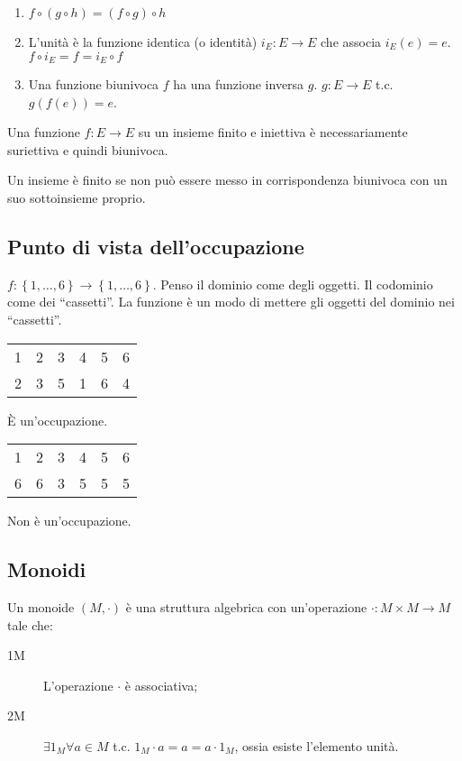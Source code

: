 \begin{enumerate}
    \item $f \circ \left( g \circ h \right) = \left( f \circ g \right) \circ h$ 
    \item L'unit\`a \`e la funzione identica (o identit\`a) $i_E : E \to E$ che associa $i_E(e) = e$. $f \circ i_E = f = i_E \circ f$ 
    \item Una funzione biunivoca $f$ ha una funzione inversa $g$. $g : E \to E $ t.c. $ g(f(e)) = e$.
\end{enumerate}

Una funzione $f : E \to E $ su un insieme finito e iniettiva \`e necessariamente suriettiva e quindi biunivoca.

Un insieme \`e finito se non pu\`o essere messo in corrispondenza biunivoca con un suo sottoinsieme proprio.

\subsection{Punto di vista dell'occupazione}

$f : \left \{ 1, \dots, 6 \right \} \to \left \{ 1, \dots, 6 \right \}$. Penso il dominio come degli oggetti. Il codominio come dei ``cassetti''. La funzione \`e un modo di mettere gli oggetti del dominio nei ``cassetti''.

\begin{tabular}{cccccc}
1 & 2 & 3 & 4 & 5 & 6 \\
2 & 3 & 5  &1 & 6 & 4
\end{tabular}
\`E un'occupazione.

\begin{tabular}{cccccc}
1 & 2 & 3 & 4 & 5 & 6 \\
6 & 6 & 3 & 5 & 5 & 5
\end{tabular}
Non \`e un'occupazione.

\subsection{Monoidi}

Un monoide $(M, \cdot)$ \`e una struttura algebrica con un'operazione $\cdot : M \times M \to M$ tale che:
\begin{description}
    \item[1M] L'operazione $\cdot$ \`e associativa;
    \item[2M] $\exists 1_M \forall a \in M $ t.c. $1_M \cdot a = a = a \cdot 1_M$, ossia esiste l'elemento unit\`a. 
\end{description}

